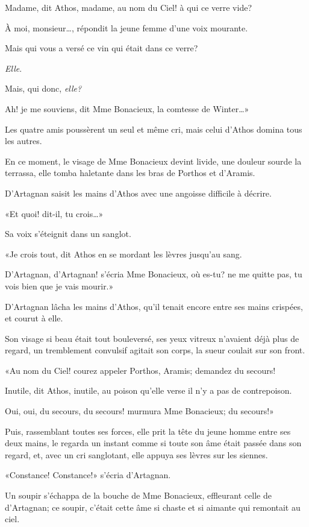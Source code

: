 \speak  Madame, dit Athos, madame, au nom du Ciel! à qui ce verre vide? 

\speak  À moi, monsieur\dots, répondit la jeune femme d'une voix mourante. 

\speak  Mais qui vous a versé ce vin qui était dans ce verre? 

\speak  \textit{Elle}. 

\speak  Mais, qui donc, \textit{elle?} 

\speak  Ah! je me souviens, dit Mme Bonacieux, la comtesse de Winter\dots» 

Les quatre amis poussèrent un seul et même cri, mais celui d'Athos domina tous les autres. 

En ce moment, le visage de Mme Bonacieux devint livide, une douleur sourde la terrassa, elle tomba haletante dans les bras de Porthos et d'Aramis. 

D'Artagnan saisit les mains d'Athos avec une angoisse difficile à décrire. 

«Et quoi! dit-il, tu crois\dots» 

Sa voix s'éteignit dans un sanglot. 

«Je crois tout, dit Athos en se mordant les lèvres jusqu'au sang. 

\speak  D'Artagnan, d'Artagnan! s'écria Mme Bonacieux, où es-tu? ne me quitte pas, tu vois bien que je vais mourir.» 

D'Artagnan lâcha les mains d'Athos, qu'il tenait encore entre ses mains crispées, et courut à elle. 

Son visage si beau était tout bouleversé, ses yeux vitreux n'avaient déjà plus de regard, un tremblement convulsif agitait son corps, la sueur coulait sur son front. 

«Au nom du Ciel! courez appeler Porthos, Aramis; demandez du secours! 

\speak  Inutile, dit Athos, inutile, au poison qu'elle verse il n'y a pas de contrepoison. 

\speak  Oui, oui, du secours, du secours! murmura Mme Bonacieux; du secours!» 

Puis, rassemblant toutes ses forces, elle prit la tête du jeune homme entre ses deux mains, le regarda un instant comme si toute son âme était passée dans son regard, et, avec un cri sanglotant, elle appuya ses lèvres sur les siennes. 

«Constance! Constance!» s'écria d'Artagnan. 

Un soupir s'échappa de la bouche de Mme Bonacieux, effleurant celle de d'Artagnan; ce soupir, c'était cette âme si chaste et si aimante qui remontait au ciel. 

